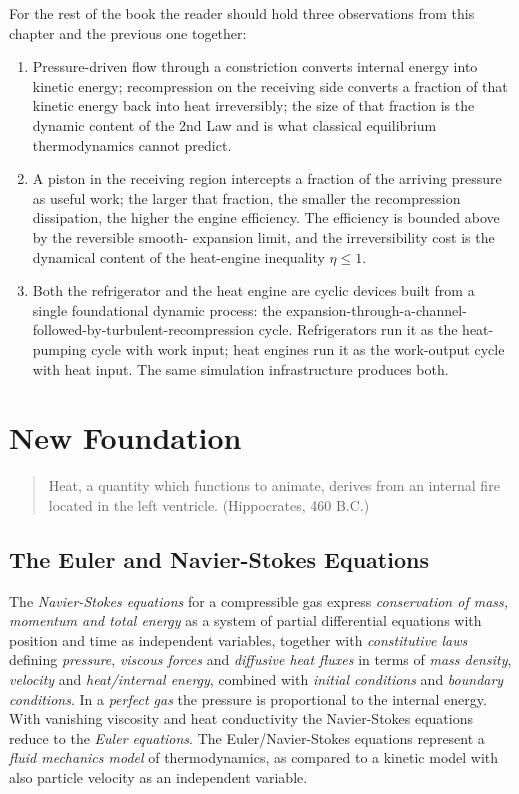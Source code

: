 For the rest of the book the reader should hold three observations
from this chapter and the previous one together:
\begin{enumerate}
\item Pressure-driven flow through a constriction converts internal
energy into kinetic energy; recompression on the receiving side
converts a fraction of that kinetic energy back into heat
irreversibly; the size of that fraction is the dynamic content of the
2nd Law and is what classical equilibrium thermodynamics cannot
predict.

\item A piston in the receiving region intercepts a fraction of the
arriving pressure as useful work; the larger that fraction, the
smaller the recompression dissipation, the higher the engine
efficiency. The efficiency is bounded above by the reversible smooth-
expansion limit, and the irreversibility cost is the dynamical content
of the heat-engine inequality $\eta \le 1$.

\item Both the refrigerator and the heat engine are cyclic devices
built from a single foundational dynamic process: the
expansion-through-a-channel-followed-by-turbulent-recompression cycle.
Refrigerators run it as the heat-pumping cycle with work input;
heat engines run it as the work-output cycle with heat input. The
same simulation infrastructure produces both.
\end{enumerate}

\fi  %

\chapter{New Foundation}\label{ch:new_foundation}
\small
\begin{quote} Heat, a quantity which functions to animate, derives
from an internal fire located in the left ventricle. (Hippocrates, 460 B.C.)
\end{quote}
\normalsize
\section{The Euler and Navier-Stokes Equations}

The \emph{Navier-Stokes equations}
for a compressible gas express
\emph{conservation of mass, momentum and total energy}
as a system of partial differential equations with position and
time as independent variables, together with
\emph{constitutive laws} defining \emph{pressure}, 
\emph{viscous forces} and \emph{diffusive heat fluxes} in terms of 
\emph{mass density}, 
\emph{velocity} and \emph{heat/internal energy}, combined with 
\emph{initial conditions} and \emph{boundary conditions}. In a \emph{perfect gas} 
the pressure is proportional to the internal energy. With vanishing viscosity and heat conductivity the Navier-Stokes equations 
reduce to the \emph{Euler equations}. The Euler/Navier-Stokes equations
represent a \emph{fluid mechanics model} of thermodynamics, as 
compared to a kinetic model with also particle velocity as an
independent variable.

